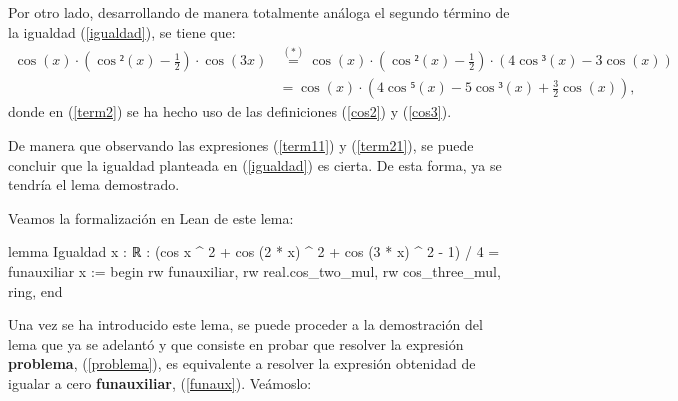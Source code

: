 \begin{demostracion}
Por otro lado, desarrollando de manera totalmente análoga el
segundo término de la igualdad (\ref{igualdad}), se tiene que:
\begin{align}
  \cos(x)·(\cos²(x)-\frac{1}{2})·\cos(3x)&\stackrel{(*)}{=}\cos(x)·
                                           (\cos²(x)-\frac{1}{2})·
                                           (4\cos³(x)-3\cos(x)
                                           )\label{term2}\\
                                         &=\cos(x)·
                                           (4\cos⁵(x)-5\cos³(x)
                                           +\frac{3}{2}\cos(x))
                                           \label{term21},
\end{align}
donde en (\ref{term2}) se ha hecho uso de las definiciones (\ref{cos2})
y (\ref{cos3}).

De manera que observando las expresiones (\ref{term11}) y (\ref{term21}),
se puede concluir que la igualdad planteada en (\ref{igualdad}) es cierta.
De esta forma, ya se tendría el lema demostrado.
\end{demostracion}

Veamos la formalización en Lean de este lema:
\begin{leancode}
lemma Igualdad {x : ℝ} :
(cos x ^ 2 + cos (2 * x) ^ 2 + cos (3 * x) ^ 2 - 1) / 4 = funauxiliar x :=
begin
  rw funauxiliar,
  rw real.cos_two_mul,
  rw cos_three_mul,
  ring,
end
\end{leancode}

Una vez se ha introducido este lema, se puede proceder a la demostración
del lema que ya se adelantó y que consiste en probar que resolver la
expresión \textbf{problema}, (\ref{problema}), es equivalente a resolver
la expresión obtenidad de igualar a cero \textbf{funauxiliar},
(\ref{funaux}). Veámoslo:

